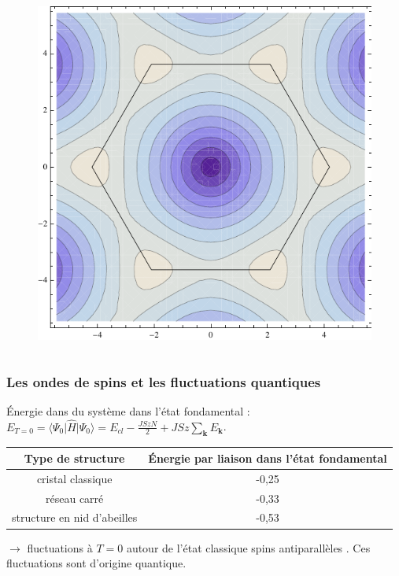 \documentclass[10pt,a4paper]{beamer}
\newcommand{\bra}[1]{\ensuremath{\langle #1|}\xspace}
\newcommand{\h}{\ensuremath{\hat{H}}\xspace}
\newcommand{\fond}{\ensuremath{| \Psi_0 \rangle}\xspace}
\newcommand{\ond}{\ensuremath{\mathbf{k}\xspace}}
\newcommand{\1}{\ensuremath{\ket{\om_1\bom_1}}\xspace}
\newcommand{\2}{\ensuremath{\ket{\om_2\bom_2}}\xspace}
\begin{document}
\begin{frame}
\begin{columns}[t]
  \begin{column}{5cm}
   	\begin{figure}[htp]
	\centering
	\includegraphics[scale=0.50]{vector_img/contour_energie_zone_brill.pdf}
	\end{figure}
  \end{column}
 \end{columns}
\end{frame}

\begin{frame}
\frametitle{Les ondes de spins et les fluctuations quantiques}

Énergie dans du système dans l'état fondamental : $E_{T=0}=\bra{\Psi_0}\h\fond=E_{cl}-\frac{JSzN}{2}+JSz\sum_{\ond}E_{\ond}$.


\begin{tabular}{|c|c|}
\hline
	\textbf{Type de structure} & Énergie par liaison dans l'état fondamental\\
\hline
	cristal classique & -0,25\\
\hline
	réseau carré  & -0,33\\
\hline
	structure en nid d'abeilles & -0,53\\
\hline
\end{tabular}
$\rightarrow$ fluctuations à $T=0$ autour de l'état classique \og spins antiparallèles \fg{}. Ces fluctuations sont d'origine quantique.
\end{frame}
\end{document}
